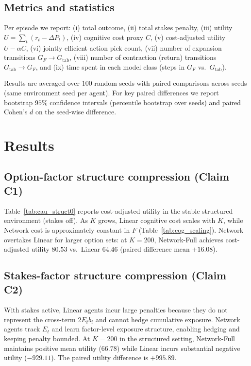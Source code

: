 \documentclass[11pt]{article}
\begin{document}
\subsection{Metrics and statistics}

Per episode we report:
(i) total outcome, (ii) total stakes penalty, (iii) utility $U=\sum_t (r_t-\Delta P_t)$,
(iv) cognitive cost proxy $C$, (v) cost-adjusted utility $U-\alpha C$,
(vi) jointly efficient action pick count, (vii) number of expansion transitions $G_F\rightarrow G_{\mathrm{tab}}$,
(viii) number of contraction (return) transitions $G_{\mathrm{tab}}\rightarrow G_F$, and
(ix) time spent in each model class (steps in $G_F$ vs.\ $G_{\mathrm{tab}}$).

Results are averaged over $100$ random seeds with paired comparisons across seeds (same environment seed per agent). For key paired differences we report bootstrap $95\%$ confidence intervals (percentile bootstrap over seeds) and paired Cohen's $d$ on the seed-wise difference.

\section{Results}

\subsection{Option-factor structure compression (Claim C1)}

Table~\ref{tab:cau_struct0} reports cost-adjusted utility in the stable structured environment (stakes off). As $K$ grows, Linear cognitive cost scales with $K$, while Network cost is approximately constant in $F$ (Table~\ref{tab:cog_scaling}). Network overtakes Linear for larger option sets: at $K=200$, Network-Full achieves cost-adjusted utility $80.53$ vs.\ Linear $64.46$ (paired difference mean $+16.08$).

\subsection{Stakes-factor structure compression (Claim C2)}

With stakes active, Linear agents incur large penalties because they do not represent the cross-term $2E_tb_i$ and cannot hedge cumulative exposure. Network agents track $E_t$ and learn factor-level exposure structure, enabling hedging and keeping penalty bounded. At $K=200$ in the structured setting, Network-Full maintains positive mean utility ($66.78$) while Linear incurs substantial negative utility ($-929.11$). The paired utility difference is $+995.89$.
\end{document}
